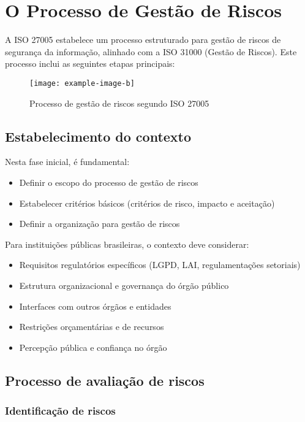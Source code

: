 \documentclass[12pt,a4paper]{report}
\begin{document}
\section{O Processo de Gestão de Riscos}

A ISO 27005 estabelece um processo estruturado para gestão de riscos de segurança da informação, alinhado com a ISO 31000 (Gestão de Riscos). Este processo inclui as seguintes etapas principais:

\begin{figure}[h]
\centering
\texttt{[image: example-image-b]}
\caption{Processo de gestão de riscos segundo ISO 27005}
\end{figure}

\subsection{Estabelecimento do contexto}

Nesta fase inicial, é fundamental:

\begin{itemize}
  \item Definir o escopo do processo de gestão de riscos
  \item Estabelecer critérios básicos (critérios de risco, impacto e aceitação)
  \item Definir a organização para gestão de riscos
\end{itemize}

Para instituições públicas brasileiras, o contexto deve considerar:

\begin{itemize}
  \item Requisitos regulatórios específicos (LGPD, LAI, regulamentações setoriais)
  \item Estrutura organizacional e governança do órgão público
  \item Interfaces com outros órgãos e entidades
  \item Restrições orçamentárias e de recursos
  \item Percepção pública e confiança no órgão
\end{itemize}

\subsection{Processo de avaliação de riscos}

\subsubsection{Identificação de riscos}
\end{document}
